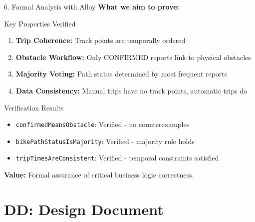 \documentclass[aspectratio=169, 10pt]{beamer}
\begin{document}
\begin{frame}{6. Formal Analysis with Alloy}
    \textbf{What we aim to prove:}
    
    \vspace{0.3cm}
    \begin{block}{Key Properties Verified}
        \begin{enumerate}
            \item \textbf{Trip Coherence:} Track points are temporally ordered
            \item \textbf{Obstacle Workflow:} Only CONFIRMED reports link to physical obstacles
            \item \textbf{Majority Voting:} Path status determined by most frequent reports
            \item \textbf{Data Consistency:} Manual trips have no track points, automatic trips do
        \end{enumerate}
    \end{block}
    
    \vspace{0.3cm}
    \begin{block}{Verification Results}
        \begin{itemize}
            \item \texttt{confirmedMeansObstacle}: Verified - no counterexamples
            \item \texttt{bikePathStatusIsMajority}: Verified - majority rule holds
            \item \texttt{tripTimesAreConsistent}: Verified - temporal constraints satisfied
        \end{itemize}
    \end{block}
    
    \vspace{0.2cm}
    \textbf{Value:} Formal assurance of critical business logic correctness.
\end{frame}

\section{DD: Design Document}
\end{document}
